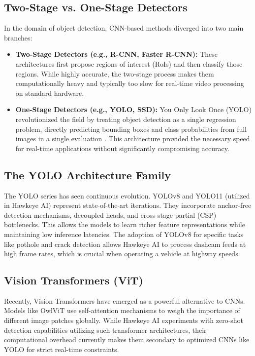 \subsection{Two-Stage vs. One-Stage Detectors}
In the domain of object detection, CNN-based methods diverged into two main branches:
\begin{itemize}
    \item \textbf{Two-Stage Detectors (e.g., R-CNN, Faster R-CNN):} These architectures first propose regions of interest (RoIs) and then classify those regions. While highly accurate, the two-stage process makes them computationally heavy and typically too slow for real-time video processing on standard hardware.
    \item \textbf{One-Stage Detectors (e.g., YOLO, SSD):} You Only Look Once (YOLO) revolutionized the field by treating object detection as a single regression problem, directly predicting bounding boxes and class probabilities from full images in a single evaluation \cite{redmon2016you}. This architecture provided the necessary speed for real-time applications without significantly compromising accuracy.
\end{itemize}

\subsection{The YOLO Architecture Family}
The YOLO series \cite{jocher2023ultralytics} has seen continuous evolution. YOLOv8 and YOLO11 (utilized in Hawkeye AI) represent state-of-the-art iterations. They incorporate anchor-free detection mechanisms, decoupled heads, and cross-stage partial (CSP) bottlenecks. This allows the models to learn richer feature representations while maintaining low inference latencies. The adoption of YOLOv8 for specific tasks like pothole and crack detection allows Hawkeye AI to process dashcam feeds at high frame rates, which is crucial when operating a vehicle at highway speeds.

\subsection{Vision Transformers (ViT)}
Recently, Vision Transformers have emerged as a powerful alternative to CNNs. Models like OwlViT \cite{minderer2022simple} use self-attention mechanisms to weigh the importance of different image patches globally. While Hawkeye AI experiments with zero-shot detection capabilities utilizing such transformer architectures, their computational overhead currently makes them secondary to optimized CNNs like YOLO for strict real-time constraints.

